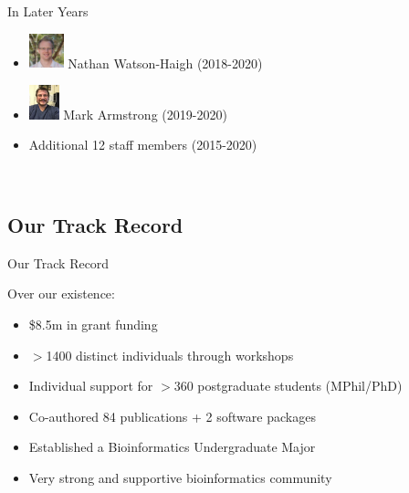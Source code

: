 \documentclass[11pt]{beamer}
\begin{document}
\begin{frame}{In Later Years}

	\begin{itemize}
		\item \includegraphics[height=1cm]{figures/Watson-Haigh.jpeg} Nathan Watson-Haigh (2018-2020) 
		\item \includegraphics[height=1cm]{figures/Mark.jpg}  Mark Armstrong (2019-2020)
		\item Additional 12 staff members (2015-2020)
	\end{itemize}
	~\\[1cm]
	
\end{frame}


\subsection{Our Track Record}

\begin{frame}{Our Track Record}

Over our existence:

	\begin{itemize}
		\item \$8.5m in grant funding
		\item $>$1400 distinct individuals through workshops
		\item Individual support for $>$360 postgraduate students (MPhil/PhD)
		\item Co-authored 84 publications + 2 software packages
		\item Established a Bioinformatics Undergraduate Major
		\item Very strong and supportive bioinformatics community\\[5mm]
	\end{itemize}

\end{frame}
\end{document}
